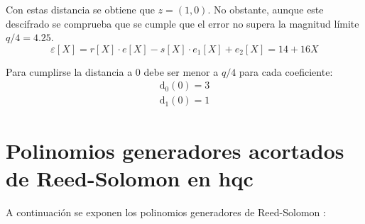 Con estas distancia se obtiene que \(z=(1,0)\). No obstante, aunque este descifrado se comprueba que se cumple que el error no supera la magnitud límite $q/4=4.25$.
\begin{equation}
	\varepsilon [X]=r[X]\cdot e[X]- s[X]\cdot e_1[X] +e_2[X]=14+16X
\end{equation}

Para cumplirse la distancia a \(0\) debe ser menor a $q/4$ para cada coeficiente:
\begin{equation}
	\begin{array}{l}
		\text{d}_0(0) = 3 \\
		\text{d}_1(0) = 1
	\end{array} 
\end{equation}

\chapter{Polinomios generadores acortados de Reed-Solomon en \acrshort{hqc}}
\label{chap:rsPoly}
A continuación se exponen los polinomios generadores de Reed-Solomon \cite{hqc2025}:

